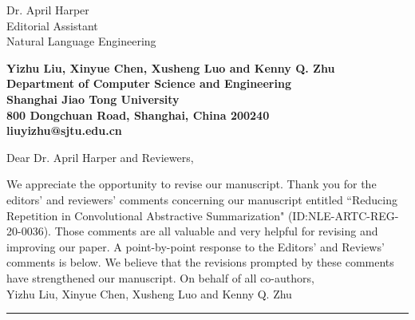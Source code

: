 \documentclass[11pt]{letter} %
\theoremstyle{definition}
\begin{document}
	
	
	\begin{letter}{Dr. April Harper \\
            Editorial Assistant \\
			Natural Language Engineering}
		
        \begin{center}
        \large\bf Yizhu Liu, Xinyue Chen, Xusheng Luo and Kenny Q. Zhu \\ %
        Department of Computer Science and Engineering \\ Shanghai Jiao Tong University \\ 800 Dongchuan Road, Shanghai, China 200240 \\
        liuyizhu@sjtu.edu.cn
        \end{center} 
        \vfill

        \signature{Yizhu Liu, Xinyue Chen, Xusheng Luo and Kenny Q. Zhu} %
		
		
		\opening{Dear Dr. April Harper and Reviewers,} 
		
		We appreciate the opportunity to revise our manuscript. 
		Thank you for the editors' and reviewers' comments concerning our 
		manuscript entitled ``Reducing Repetition in Convolutional Abstractive Summarization" (ID:NLE-ARTC-REG-20-0036). 
		Those comments are all valuable and very helpful
		for revising and improving our paper.
		A point-by-point response to the Editors' and Reviews' comments is below. 
		We believe that the revisions prompted by these comments have strengthened our manuscript.
		\newline\newline
		On behalf of all co-authors,\\
		Yizhu Liu, Xinyue Chen, Xusheng Luo and Kenny Q. Zhu
		\newline\hrule


\end{letter}
\end{document}
